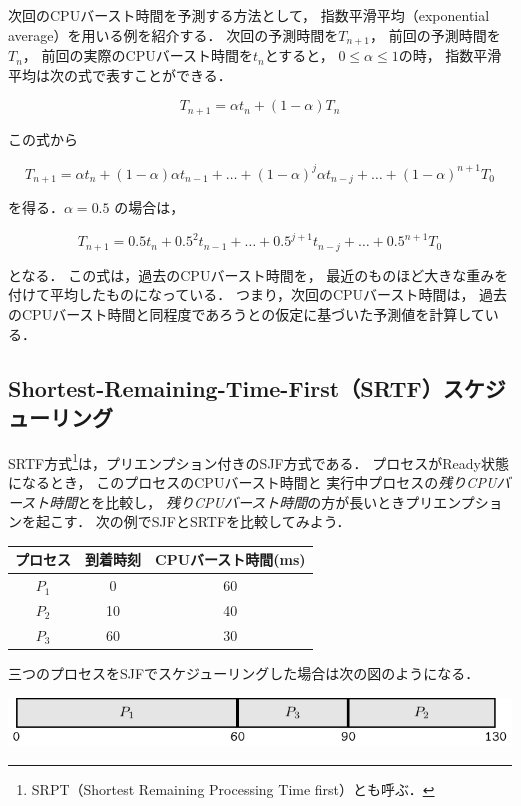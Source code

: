 次回のCPUバースト時間を予測する方法として，
指数平滑平均（exponential average）を用いる例を紹介する．
次回の予測時間を$T_{n+1}$，
前回の予測時間を$T_{n}$，
前回の実際のCPUバースト時間を$t_{n}$とすると，
$0 \le \alpha \le 1$の時，
指数平滑平均は次の式で表すことができる．

\[T_{n+1} = \alpha t_n + ( 1 - \alpha ) T_n\]

この式から

\[T_{n+1} = \alpha t_n + ( 1 - \alpha ) \alpha t_{n-1} + \dots +
( 1 - \alpha )^j \alpha t_{n-j} + \dots + (1 - \alpha )^{n+1} T_0 \]

を得る．$\alpha = 0.5$ の場合は，

\[T_{n+1} = 0.5 t_n + 0.5^2 t_{n-1} + \dots +
0.5^{j+1} t_{n-j} + \dots + 0.5^{n+1} T_0 \]

となる．
この式は，過去のCPUバースト時間を，
最近のものほど大きな重みを付けて平均したものになっている．
つまり，次回のCPUバースト時間は，
過去のCPUバースト時間と同程度であろうとの仮定に基づいた予測値を計算している．

\subsection{Shortest-Remaining-Time-First（SRTF）スケジューリング}
SRTF方式\footnote{
  SRPT（Shortest Remaining Processing Time first）とも呼ぶ．
}は，プリエンプション付きのSJF方式である．
プロセスがReady状態になるとき，
このプロセスのCPUバースト時間と
実行中プロセスの\emph{残りCPUバースト時間}とを比較し，
\emph{残りCPUバースト時間}の方が長いときプリエンプションを起こす．
次の例でSJFとSRTFを比較してみよう．

\begin{center}
  \begin{tabular}{c c c}
    プロセス & 到着時刻 & CPUバースト時間(ms) \\
    \hline
    $P_1$    & 0  & 60 \\
    $P_2$    & 10 & 40 \\
    $P_3$    & 60 & 30 \\
  \end{tabular}
\end{center}

三つのプロセスをSJFでスケジューリングした場合は次の図のようになる．

\begin{center}
  \includegraphics[scale=1.0]{GanntChart/sjf2.pdf}
\end{center}

